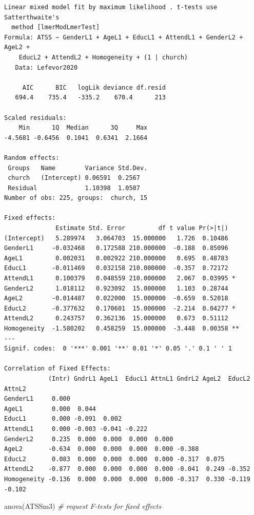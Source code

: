 \documentclass[
  11pt,
]{book}
\newenvironment{Shaded}{\begin{snugshade}}{\end{snugshade}}
\newcommand{\CommentTok}[1]{\textcolor[rgb]{0.56,0.35,0.01}{\textit{#1}}}
\newcommand{\FunctionTok}[1]{\textcolor[rgb]{0.00,0.00,0.00}{#1}}
\newcommand{\NormalTok}[1]{#1}
\begin{document}
\begin{verbatim}
Linear mixed model fit by maximum likelihood . t-tests use Satterthwaite's
  method [lmerModLmerTest]
Formula: ATSS ~ GenderL1 + AgeL1 + EducL1 + AttendL1 + GenderL2 + AgeL2 +  
    EducL2 + AttendL2 + Homogeneity + (1 | church)
   Data: Lefevor2020

     AIC      BIC   logLik deviance df.resid 
   694.4    735.4   -335.2    670.4      213 

Scaled residuals: 
    Min      1Q  Median      3Q     Max 
-4.5681 -0.6456  0.1041  0.6341  2.1664 

Random effects:
 Groups   Name        Variance Std.Dev.
 church   (Intercept) 0.06591  0.2567  
 Residual             1.10398  1.0507  
Number of obs: 225, groups:  church, 15

Fixed effects:
              Estimate Std. Error         df t value Pr(>|t|)   
(Intercept)   5.289974   3.064703  15.000000   1.726  0.10486   
GenderL1     -0.032468   0.172588 210.000000  -0.188  0.85096   
AgeL1         0.002031   0.002922 210.000000   0.695  0.48783   
EducL1       -0.011469   0.032158 210.000000  -0.357  0.72172   
AttendL1      0.100379   0.048559 210.000000   2.067  0.03995 * 
GenderL2      1.018112   0.923092  15.000000   1.103  0.28744   
AgeL2        -0.014487   0.022000  15.000000  -0.659  0.52018   
EducL2       -0.377632   0.170601  15.000000  -2.214  0.04277 * 
AttendL2      0.243757   0.362136  15.000000   0.673  0.51112   
Homogeneity  -1.580202   0.458259  15.000000  -3.448  0.00358 **
---
Signif. codes:  0 '***' 0.001 '**' 0.01 '*' 0.05 '.' 0.1 ' ' 1

Correlation of Fixed Effects:
            (Intr) GndrL1 AgeL1  EducL1 AttnL1 GndrL2 AgeL2  EducL2 AttnL2
GenderL1     0.000                                                        
AgeL1        0.000  0.044                                                 
EducL1       0.000 -0.091  0.002                                          
AttendL1     0.000 -0.003 -0.041 -0.222                                   
GenderL2     0.235  0.000  0.000  0.000  0.000                            
AgeL2       -0.634  0.000  0.000  0.000  0.000 -0.388                     
EducL2       0.083  0.000  0.000  0.000  0.000 -0.317  0.075              
AttendL2    -0.877  0.000  0.000  0.000  0.000 -0.041  0.249 -0.352       
Homogeneity -0.136  0.000  0.000  0.000  0.000 -0.317  0.330 -0.119 -0.102
\end{verbatim}

\begin{Shaded}
\begin{Highlighting}[]
\FunctionTok{anova}\NormalTok{(ATSSm3) }\CommentTok{\# request F{-}tests for fixed effects}
\end{Highlighting}
\end{Shaded}
\end{document}
